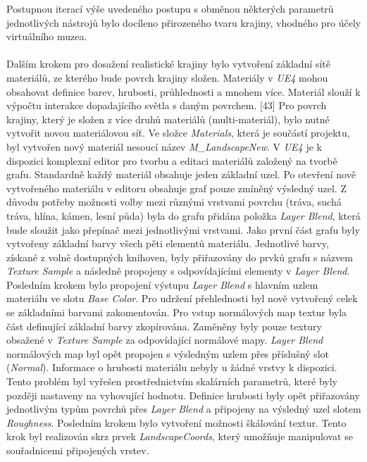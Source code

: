 \documentclass[a4paper, 12pt]{report}
\begin{document}
Postupnou iterací výše uvedeného postupu s obměnou některých parametrů jednotlivých nástrojů bylo docíleno přirozeného tvaru krajiny, vhodného pro účely virtuálního muzea.\\
\\
Dalším krokem pro dosažení realistické krajiny bylo vytvoření základní sítě materiálů, ze kterého bude povrch krajiny složen. Materiály v \textit{UE4} mohou obsahovat definice barev, hrubosti, průhlednosti a mnohem více. Materiál slouží k výpočtu interakce dopadajícího světla s daným povrchem. [43] Pro povrch krajiny, který je složen z více druhů materiálů (multi-materiál), bylo nutné vytvořit novou materiálovou síť. Ve složce \textit{Materials}, která je součástí projektu, byl vytvořen nový materiál nesoucí název \textit{M\_LandscapeNew}. V \textit{UE4} je k dispozici komplexní editor pro tvorbu a editaci materiálů založený na tvorbě grafu. Standardně každý materiál obsahuje jeden základní uzel. Po otevření nově vytvořeného materiálu v editoru obsahuje graf pouze zmíněný výsledný uzel. Z důvodu potřeby možnosti volby mezi různými vrstvami povrchu (tráva, suchá tráva, hlína, kámen, lesní půda) byla do grafu přidána položka \textit{Layer Blend}, která bude sloužit jako přepínač mezi jednotlivými vrstvami. Jako první část grafu byly vytvořeny základní barvy všech pěti elementů materiálu. Jednotlivé barvy, získané z volně dostupných knihoven, byly přiřazovány do prvků grafu s názvem \textit{Texture Sample} a následně propojeny s odpovídajícími elementy v \textit{Layer Blend}. Posledním krokem bylo propojení výstupu \textit{Layer Blend} s hlavním uzlem materiálu ve slotu \textit{Base Color}. Pro udržení přehlednosti byl nově vytvořený celek se základními barvami zakomentován. Pro vstup normálových map textur byla část definující základní barvy zkopírována. Zaměněny byly pouze textury obsažené v \textit{Texture Sample} za odpovídající normálové mapy. \textit{Layer Blend} normálových map byl opět propojen s výsledným uzlem přes příslušný slot (\textit{Normal}). Informace o hrubosti materiálu nebyly u žádné vrstvy k dispozici. Tento problém byl vyřešen prostřednictvím skalárních parametrů, které byly později nastaveny na vyhovující hodnotu. Definice hrubosti byly opět přiřazovány jednotlivým typům povrchů přes \textit{Layer Blend} a připojeny na výsledný uzel slotem \textit{Roughness}. Posledním krokem bylo vytvoření možnosti škálování textur. Tento krok byl realizován skrz prvek \textit{LandscapeCoords}, který umožňuje manipulovat se souřadnicemi připojených vrstev. 
\end{document}
